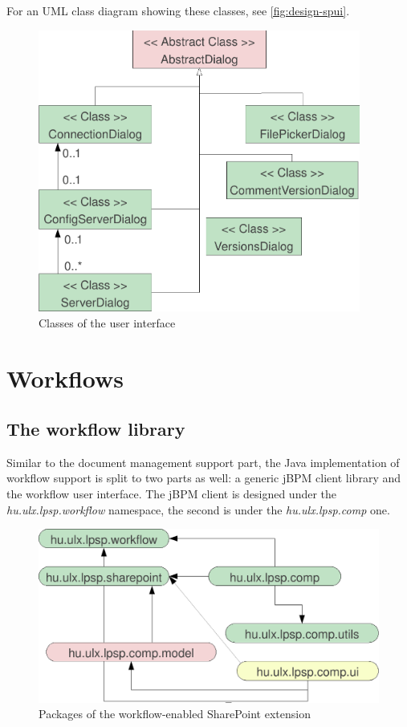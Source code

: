 For an UML class diagram showing these classes, see \autoref{fig:design-spui}.

\begin{figure}[p]
\centering
\includegraphics[width=400px,keepaspectratio]{design-spui.pdf}
\caption{Classes of the user interface}
\label{fig:design-spui}
\end{figure}

\section{Workflows}

\subsection{The workflow library}

Similar to the document management support part, the Java implementation of
workflow support is split to two parts as well: a generic jBPM client library
and the workflow user interface. The jBPM client is designed under the
\emph{hu.ulx.lpsp.workflow} namespace, the second is under the
\emph{hu.ulx.lpsp.comp} one.

\begin{figure}[H]
\centering
\includegraphics[width=425px,keepaspectratio]{design-packages-wf.pdf}
\caption{Packages of the workflow-enabled SharePoint extension}
\label{fig:design-packages-wf}
\end{figure}

